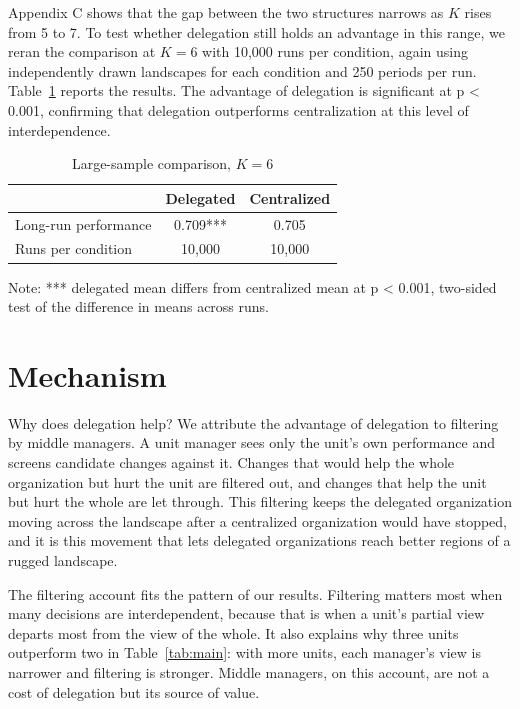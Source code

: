 \documentclass[11pt]{article}
\begin{document}
Appendix C shows that the gap between the two structures narrows as $K$ rises from 5 to 7. To test whether delegation still holds an advantage in this range, we reran the comparison at $K = 6$ with 10,000 runs per condition, again using independently drawn landscapes for each condition and 250 periods per run. Table~\ref{tab:signif} reports the results. The advantage of delegation is significant at p < 0.001, confirming that delegation outperforms centralization at this level of interdependence.

\begin{table}[h]
\centering
\caption{Large-sample comparison, $K = 6$}
\label{tab:signif}
\begin{tabular}{lcc}
\toprule
 & Delegated & Centralized \\
\midrule
Long-run performance & 0.709*** & 0.705 \\
Runs per condition & 10,000 & 10,000 \\
\bottomrule
\end{tabular}

\smallskip
\footnotesize Note: *** delegated mean differs from centralized mean at p < 0.001, two-sided test of the difference in means across runs.
\end{table}

\section{Mechanism}

Why does delegation help? We attribute the advantage of delegation to filtering by middle managers. A unit manager sees only the unit's own performance and screens candidate changes against it. Changes that would help the whole organization but hurt the unit are filtered out, and changes that help the unit but hurt the whole are let through. This filtering keeps the delegated organization moving across the landscape after a centralized organization would have stopped, and it is this movement that lets delegated organizations reach better regions of a rugged landscape.

The filtering account fits the pattern of our results. Filtering matters most when many decisions are interdependent, because that is when a unit's partial view departs most from the view of the whole. It also explains why three units outperform two in Table~\ref{tab:main}: with more units, each manager's view is narrower and filtering is stronger. Middle managers, on this account, are not a cost of delegation but its source of value.
\end{document}
